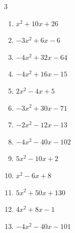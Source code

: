 \begin{multicols}{3}
\begin{enumerate}

  \item $x^{2}+10x+26$


  \item $-3x^{2}+6x-6$


  \item $-4x^{2}+32x-64$


  \item $-4x^{2}+16x-15$


  \item $2x^{2}-4x+5$


  \item $-3x^{2}+30x-71$


  \item $-2x^{2}-12x-13$


  \item $-4x^{2}-40x-102$


  \item $5x^{2}-10x+2$


\columnbreak %

  \item $x^{2}-6x+8$


  \item $5x^{2}+50x+130$


  \item $4x^{2}+8x-1$


  \item $-4x^{2}-40x-101$



\end{enumerate}
\end{multicols}
